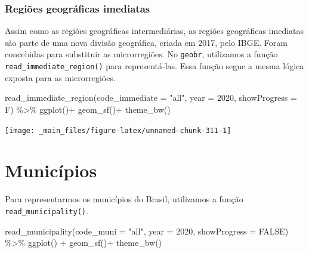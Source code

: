 \documentclass[
  brazilian,
]{book}
\newenvironment{Shaded}{\begin{snugshade}}{\end{snugshade}}
\newcommand{\AttributeTok}[1]{\textcolor[rgb]{0.77,0.63,0.00}{#1}}
\newcommand{\ConstantTok}[1]{\textcolor[rgb]{0.00,0.00,0.00}{#1}}
\newcommand{\DecValTok}[1]{\textcolor[rgb]{0.00,0.00,0.81}{#1}}
\newcommand{\FunctionTok}[1]{\textcolor[rgb]{0.00,0.00,0.00}{#1}}
\newcommand{\NormalTok}[1]{#1}
\newcommand{\SpecialCharTok}[1]{\textcolor[rgb]{0.00,0.00,0.00}{#1}}
\newcommand{\StringTok}[1]{\textcolor[rgb]{0.31,0.60,0.02}{#1}}
\begin{document}
\hypertarget{regiuxf5es-geogruxe1ficas-imediatas}{%
\subsubsection{Regiões geográficas imediatas}\label{regiuxf5es-geogruxe1ficas-imediatas}}

Assim como as regiões geográficas intermediárias, as regiões geográficas imediatas são parte de uma nova divisão geográfica, criada em 2017, pelo IBGE. Foram concebidas para substituir as microrregiões. No \texttt{geobr}, utilizamos a função \texttt{read\_immediate\_region()} para representá-las. Essa função segue a mesma lógica exposta para as microrregiões.

\begin{Shaded}
\begin{Highlighting}[]
\FunctionTok{read\_immediate\_region}\NormalTok{(}\AttributeTok{code\_immediate =} \StringTok{"all"}\NormalTok{,}
                      \AttributeTok{year =} \DecValTok{2020}\NormalTok{,}
                      \AttributeTok{showProgress =}\NormalTok{ F) }\SpecialCharTok{\%\textgreater{}\%} 
  \FunctionTok{ggplot}\NormalTok{()}\SpecialCharTok{+}
  \FunctionTok{geom\_sf}\NormalTok{()}\SpecialCharTok{+}
  \FunctionTok{theme\_bw}\NormalTok{()}
\end{Highlighting}
\end{Shaded}

\begin{center}\texttt{[image: \_main\_files/figure-latex/unnamed-chunk-311-1]} \end{center}

\hypertarget{municuxedpios}{%
\section{Municípios}\label{municuxedpios}}

Para representarmos os municípios do Brasil, utilizamos a função \texttt{read\_municipality()}.

\begin{Shaded}
\begin{Highlighting}[]
\FunctionTok{read\_municipality}\NormalTok{(}\AttributeTok{code\_muni =} \StringTok{"all"}\NormalTok{,}
                  \AttributeTok{year =} \DecValTok{2020}\NormalTok{,}
                  \AttributeTok{showProgress =} \ConstantTok{FALSE}\NormalTok{) }\SpecialCharTok{\%\textgreater{}\%} 
  \FunctionTok{ggplot}\NormalTok{() }\SpecialCharTok{+}
  \FunctionTok{geom\_sf}\NormalTok{()}\SpecialCharTok{+}
  \FunctionTok{theme\_bw}\NormalTok{()}
\end{Highlighting}
\end{Shaded}
\end{document}
